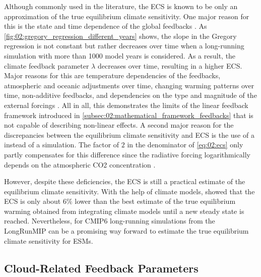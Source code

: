 Although commonly used in the literature, the \ac{ECS} is known to be only an
approximation of the true equilibrium climate sensitivity. One major reason for
this is the state and time dependence of the global feedbacks
\autocite{Knutti2015, Knutti2017}. As
\cref{fig:02:gregory_regression_different_years} shows, the slope in the
Gregory regression is not constant but rather decreases over time when a
long-running  simulation with more than 1000 model years is
considered. As a result, the climate feedback parameter $\lambda$ decreases
over time, resulting in a higher \ac{ECS}. Major reasons for this are
temperature dependencies of the feedbacks, atmospheric and oceanic adjustments
over time, changing warming patterns over time, non-additive feedbacks, and
dependencies on the type and magnitude of the external forcings
\autocite{Knutti2017}. All in all, this demonstrates the limits of the linear
feedback framework introduced in
\cref{subsec:02:mathematical_framework_feedbacks} that is not capable of
describing non-linear effects. A second major reason for the discrepancies
between the equilibrium climate sensitivity and \ac{ECS} is the use of a
 instead of a  simulation. The factor of $2$ in the
denominator of \cref{eq:02:ecs} only partly compensates for this difference
since the radiative forcing logarithmically depends on the atmospheric \ac{CO2}
concentration \autocite{Huang2014}.

However, despite these deficiencies, the \ac{ECS} is still a practical estimate
of the equilibrium climate sensitivity. With the help of climate models,
\textcite{Sherwood2020} showed that the \ac{ECS} is only about $6 \unit{\%}$
lower than the best estimate of the true equilibrium warming obtained from
integrating climate models until a new steady state is reached. Nevertheless,
for \acs{CMIP}6 long-running simulations from the \ac{LongRunMIP}
\autocite{Rugenstein2019} can be a promising way forward to estimate the true
equilibrium climate sensitivity for \acp{ESM}.


\subsection{Cloud-Related Feedback Parameters}
\label{subsec:02:cloud_feedback_parameters}

